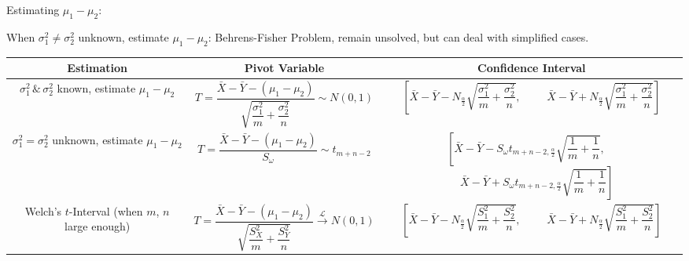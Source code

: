 \documentclass[11pt,a4paper]{ctexart}
\numberwithin{equation}{section}%
\begin{document}
\begin{enumerate}
    Estimating $\mu_1-\mu_2$:
    
    When $\sigma_1^2\neq\sigma^2_2$ unknown, estimate $\mu_1-\mu_2$: Behrens-Fisher Problem, remain unsolved, but can deal with simplified cases. 

    \begin{table}[htbp]
        \centering
        \renewcommand\arraystretch{2.2}
        \begin{tabular}{|c|c|c|}
            \hline
            Estimation& Pivot Variable & Confidence Interval\\
            \hline
            \makecell{$\sigma_1^2\,\&\,\sigma_2^2$ known,\\estimate $\mu_1-\mu_2$}&$ T=\dfrac{\bar{X}-\bar{Y}-(\mu_1-\mu_2)}{\sqrt{\dfrac{\sigma_1^2}{m}+\dfrac{\sigma^2_2}{n}}}\sim N(0,1)$&\makecell{$\left[\bar{X}-\bar{Y}-N_{\frac{\alpha}{2}}\sqrt{\dfrac{\sigma_1^2}{m}+\dfrac{\sigma_2^2}{n}},\right.\quad $\\$\quad\left.\bar{X}-\bar{Y}+N_{\frac{\alpha}{2}}\sqrt{\dfrac{\sigma_1^2}{m}+\dfrac{\sigma_2^2}{n}}   \right]$}\\
            \hline
            \makecell{$\sigma_1^2=\sigma^2_2$ unknown,\\estimate $\mu_1-\mu_2$}&$T=\dfrac{\bar{X}-\bar{Y}-(\mu_1-\mu_2)}{S_\omega}\sim t_{m+n-2}$&\makecell{$\left[\bar{X}-\bar{Y}-S_\omega t_{m+n-2,\frac{\alpha}{2}}\sqrt{\dfrac{1}{m}+\dfrac{1}{n}}\right.,\quad $\\$\left.\quad\bar{X}-\bar{Y}+S_\omega t_{m+n-2,\frac{\alpha}{2}}\sqrt{\dfrac{1}{m}+\dfrac{1}{n}} \right]$}\\
            \hline
            \makecell{Welch's $t$-Interval\\(when $m$, $n$ large enough)}&$T=\dfrac{\bar{X}-\bar{Y}-(\mu_1-\mu_2)}{\sqrt{\dfrac{S_X^2}{m}+\dfrac{S^2_Y}{n}}}\xrightarrow[]{\mathscr{L}} N(0,1)$&\makecell{$\left[\bar{X}-\bar{Y}-N_{\frac{\alpha}{2}}\sqrt{\dfrac{S_1^2}{m}+\dfrac{S_2^2}{n}}\right.,\quad$\\$\quad\left.\bar{X}-\bar{Y}+N_{\frac{\alpha}{2}}\sqrt{\dfrac{S_1^2}{m}+\dfrac{S_2^2}{n}}\right]$}\\
            \hline
        \end{tabular}
    \end{table}


\end{enumerate}
\end{document}
